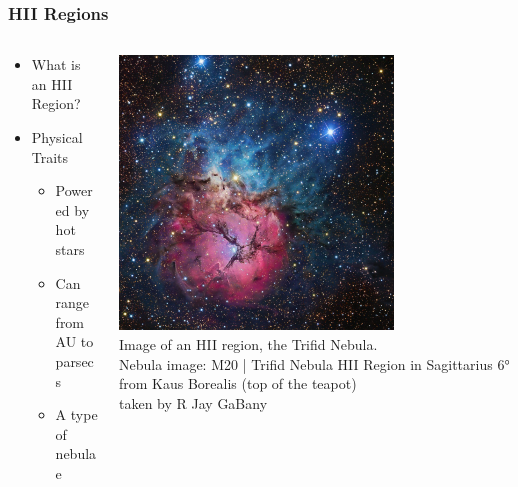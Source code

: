 \documentclass[aspectratio=169,compress]{beamer}
\newcommand\teeny{\fontsize{3pt}{3.6pt}\selectfont}
\begin{document}
\begin{frame}
  \frametitle{HII Regions}
  \begin{columns}
    \begin{column}{0.5\textwidth}%
      \begin{itemize}
        \item What is an HII Region?
        \item Physical Traits
          \begin{itemize}
            \item Powered by hot stars
            \item Can range from AU to parsecs
            \item A type of nebulae
          \end{itemize}
      \end{itemize}
    \end{column}
    \begin{column}{0.5\textwidth}%
      \teeny
      \includegraphics[width=0.7\textwidth]{figures/nebula.jpg}
      {\teeny\\ Image of an HII region, the Trifid Nebula.}
      {\teeny\\ Nebula image: M20 | Trifid Nebula HII Region in Sagittarius 6° from Kaus Borealis (top of the teapot)} 
      {\teeny\\ taken by R Jay GaBany}
      
    \end{column}
  \end{columns}
\end{frame}
\end{document}
